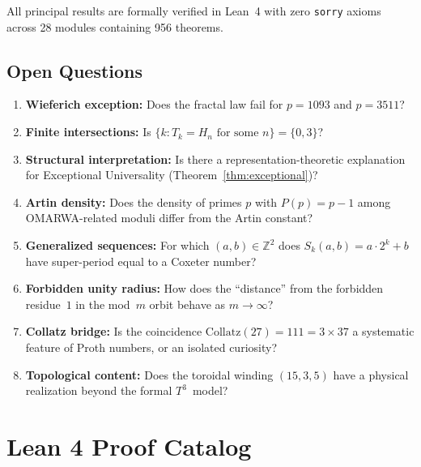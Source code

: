 \documentclass[11pt, a4paper]{article}
\theoremstyle{plain}
\theoremstyle{definition}
\theoremstyle{remark}
\begin{document}
All principal results are formally verified in Lean~4 with zero
\texttt{sorry} axioms across 28 modules containing 956 theorems.

\subsection*{Open Questions}

\begin{enumerate}
  \item \textbf{Wieferich exception:} Does the fractal law fail for
    $p = 1093$ and $p = 3511$?

  \item \textbf{Finite intersections:} Is
    $\{k : T_k = H_n \text{ for some } n\} = \{0, 3\}$?

  \item \textbf{Structural interpretation:} Is there a
    representation-theoretic explanation for Exceptional Universality
    (Theorem~\ref{thm:exceptional})?

  \item \textbf{Artin density:} Does the density of primes $p$ with
    $P(p) = p - 1$ among OMARWA-related moduli differ from the Artin
    constant?

  \item \textbf{Generalized sequences:} For which $(a,b) \in
    \mathbb{Z}^2$ does $S_k(a,b) = a \cdot 2^k + b$ have super-period
    equal to a Coxeter number?

  \item \textbf{Forbidden unity radius:} How does the ``distance'' from
    the forbidden residue~$1$ in the mod~$m$ orbit behave as
    $m \to \infty$?

  \item \textbf{Collatz bridge:} Is the coincidence
    $\mathrm{Collatz}(27) = 111 = 3 \times 37$ a systematic feature of
    Proth numbers, or an isolated curiosity?

  \item \textbf{Topological content:} Does the toroidal winding
    $(15, 3, 5)$ have a physical realization beyond the formal
    $T^3$~model?
\end{enumerate}

\appendix

\section{Lean 4 Proof Catalog}\label{app:lean}
\end{document}
